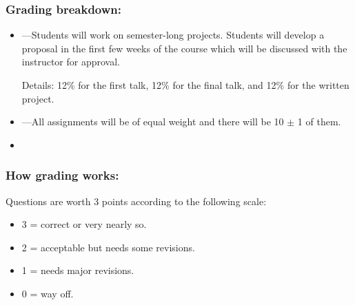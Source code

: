 \begin{frame}
  \frametitle{Grading breakdown:}

  \begin{block}{}
    \begin{itemize}
    \item 
      ---Students will 
      work on semester-long projects.  Students will develop a
      proposal in the first few weeks of the course which will be discussed
      with the instructor for approval.  

      \smallskip

      Details: 12\% for the first talk, 12\% for the final talk,
      and 12\% for the written project.
    \end{itemize}
  \end{block}
  \begin{block}{}
    \begin{itemize}
    \item 
      ---All assignments will be 
      of equal weight and there will be 10 $\pm$ 1 of them.
    \end{itemize}
  \end{block}
  \begin{block}{}
    \begin{itemize}
    \item 
    \end{itemize}
  \end{block}

\end{frame}

\begin{frame}
  \frametitle{How grading works:}

  \begin{block}{Questions are worth 3 points according to the following scale:}
    \begin{itemize}
    \item 
      3 = correct or very nearly so.
    \item 
      2 = acceptable but needs some revisions.
    \item 
      1 = needs major revisions.
    \item 
      0 = way off.
    \end{itemize}

  \end{block}

\end{frame}


